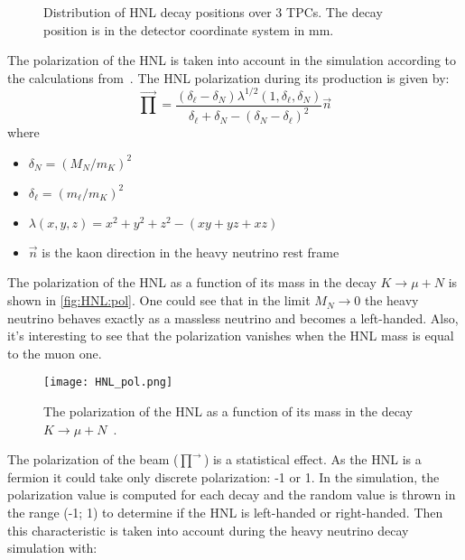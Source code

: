 \documentclass[../main.tex]{subfiles}
\begin{document}
\begin{figure}[!ht]
    \caption{Distribution of HNL decay positions over 3 TPCs. The decay position is in the detector coordinate system in mm.}
    \label{fig:HNL:decayPos}
\end{figure}

The polarization of the HNL is taken into account in the simulation according to the calculations from~\cite{Abgrall2014}. The HNL polarization during its production is given by:
\begin{equation}
    \overrightarrow\prod=\frac{\left(\delta_\ell-\delta_{N}\right)\lambda^{1/2}\left(1,\delta_\ell, \delta_{N}\right)}{\delta_\ell+\delta_{N}-\left(\delta_{N}-\delta_\ell\right)^2}\overrightarrow{n}
\end{equation}
where
\begin{itemize}
    \item $\delta_{N}=\left(M_{N}/m_K\right)^2$
    \item $\delta_\ell=\left(m_\ell/m_K\right)^2$
    \item $\lambda\left(x, y, z\right)=x^2+y^2+z^2-\left(xy+yz+xz\right)$
    \item $\overrightarrow{n}$ is the kaon direction in the heavy neutrino rest frame
\end{itemize}

The polarization of the HNL as a function of its mass in the decay $K\to\mu+N$ is shown in \autoref{fig:HNL:pol}. One could see that in the limit $M_N\to0$ the heavy neutrino behaves exactly as a massless neutrino and becomes a left-handed. Also, it's interesting to see that the polarization vanishes when the HNL mass is equal to the muon one.

\begin{figure}[!ht]
    \centering
    \texttt{[image: HNL\_pol.png]}
    \caption{The polarization of the HNL as a function of its mass in the decay $K\to\mu+N$~\cite{Abgrall2014}.}
    \label{fig:HNL:pol}
\end{figure}

The polarization of the beam ($\overrightarrow{\prod}$) is a statistical effect. As the HNL is a fermion it could take only discrete polarization: -1 or 1. In the simulation, the polarization value is computed for each decay and the random value is thrown in the range (-1; 1) to determine if the HNL is left-handed or right-handed. Then this characteristic is taken into account during the heavy neutrino decay simulation with:
\end{document}
